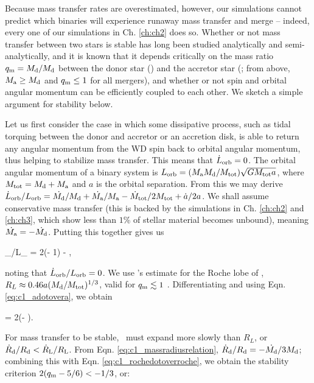 Because mass transfer rates are overestimated, however, our simulations cannot predict which binaries will experience runaway mass transfer and merge -- indeed, every one of our simulations in Ch. \ref{ch:ch2} does so.  Whether or not mass transfer between two stars is stable has long been studied analytically and semi-analytically, and it is known that it depends critically on the mass ratio $\qm = \Md/\Md$ between the donor star (\Md) and the accretor star (\Ma; from above, $\Ma \geq \Md$ and $\qm \leq 1$ for all mergers), and whether or not spin and orbital angular momentum can be efficiently coupled to each other.  We sketch a simple argument for stability below.

Let us first consider the case in which some dissipative process, such as tidal torquing between the donor and accretor or an accretion disk, is able to return any angular momentum from the WD spin back to orbital angular momentum, thus helping to stabilize mass transfer.  This means that $\dot{L}_\mathrm{orb} = 0$.  The orbital angular momentum of a binary system is $L_\mrm{orb} = (\Ma\Md/\Mtot)\sqrt{G\Mtot a}$, where $\Mtot = \Md + \Ma$ and $a$ is the orbital separation.  From this we may derive $\dot{L}_\mrm{orb}/L_\mrm{orb} = \dot{\Md}/\Md + \dot{\Ma}/\Ma - \dot{M}_\mrm{tot}/2\Mtot + \dot{a}/2a$.  We shall assume conservative mass transfer (this is backed by the simulations in Ch. \ref{ch:ch2} and \ref{ch:ch3}, which show less than $1$\% of stellar material becomes unbound), meaning $\dot{\Ma} = -\dot{\Md}$.  Putting this together gives us

\eqbegin
{}_/L_ = 2(\qm- 1)\frac{\dot{\Md}}{\Md} - ,
\label{eq:c1_adotovera}
\eqend

\noindent noting that $\dot{L}_\mathrm{orb}/L_\mathrm{orb} = 0$.  We use \cite{pacz71}'s estimate for the Roche lobe of \Md, $R_L \approx 0.46a(\Md/\Mtot)^{1/3}$, valid for $\qm \lesssim 1$ \citep{eggl83}.  Differentiating and using Eqn. \ref{eq:c1_adotovera}, we obtain

\eqbegin
{} = 2(\qm- )\frac{\dot{\Md}}{\Md}.
\label{eq:c1_rochedotoverroche}
\eqend

\noindent For mass transfer to be stable, \Rd\ must expand more slowly than $R_L$, or $\dot{R}_\mrm{d}/\Rd < \dot{R}_\mrm{L}/R_\mrm{L}$.  From Eqn. \ref{eq:c1_massradiusrelation}, $\dot{R}_\mrm{d}/\Rd = -\dot{\Md}/3\Md$; combining this with Eqn. \ref{eq:c1_rochedotoverroche}, we obtain the stability criterion $2(\qm- 5/6) < -1/3$, or:

